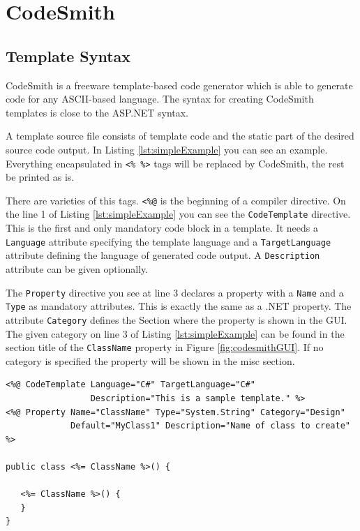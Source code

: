 \chapter{CodeSmith}
\label{cha:codeSmith}


\section{Template Syntax}
CodeSmith \cite{CodeSmith} is a freeware template-based code generator which is able to 
generate code for any ASCII-based language. The syntax for creating 
CodeSmith templates is close to the ASP.NET syntax.

A template source file consists of template code and the static part of the 
desired source code output. In Listing \ref{lst:simpleExample} you can see 
an example. Everything encapsulated in \verb~<% %>~ tags will be 
replaced by CodeSmith, the rest be printed as is.

There are varieties of this tags. \verb~<%@~ is the beginning of a 
compiler directive. On the line 1 of Listing \ref{lst:simpleExample} you 
can see the \verb~CodeTemplate~ directive. This is the first and only 
mandatory code block in a template. It needs a \verb~Language~ attribute 
specifying the template language and a \verb~TargetLanguage~ attribute 
defining the language of generated code output. A \verb~Description~ 
attribute can be given optionally.

The \verb~Property~ directive you see at line 3 declares a property 
with a \verb~Name~ and a \verb~Type~ as mandatory attributes. This is exactly 
the same as a .NET property. The attribute \verb~Category~ defines
the Section where the property is shown in the GUI. The given category on 
line 3 of Listing \ref{lst:simpleExample} can be found in the section title 
of the \verb~ClassName~ property in Figure \ref{fig:codesmithGUI}. If no 
category is specified the property will be shown in the misc section.

\begin{lstlisting}[float,caption=Simple Example,label=lst:simpleExample]
<%@ CodeTemplate Language="C#" TargetLanguage="C#"
                 Description="This is a sample template." %>
<%@ Property Name="ClassName" Type="System.String" Category="Design"
             Default="MyClass1" Description="Name of class to create" %>

public class <%= ClassName %>() {

   <%= ClassName %>() {
   }
}
\end{lstlisting}

